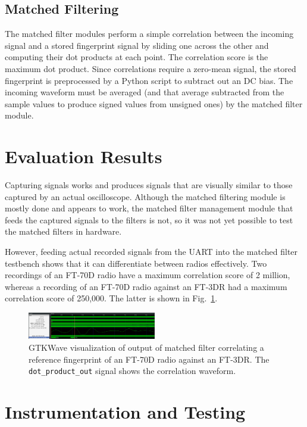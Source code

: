\documentclass[conference]{IEEEtran}
\begin{document}
\subsection{Matched Filtering}

The matched filter modules perform a simple correlation between the incoming signal and a stored fingerprint signal by sliding one across the other and computing their dot products at each point. The correlation score is the maximum dot product. Since correlations require a zero-mean signal, the stored fingerprint is preprocessed by a Python script to subtract out an DC bias. The incoming waveform must be averaged (and that average subtracted from the sample values to produce signed values from unsigned ones) by the matched filter module.

\section{Evaluation Results}

Capturing signals works and produces signals that are visually similar to those captured by an actual oscilloscope. Although the matched filtering module is mostly done and appears to work, the matched filter management module that feeds the captured signals to the filters is not, so it was not yet possible to test the matched filters in hardware.

However, feeding actual recorded signals from the UART into the matched filter testbench shows that it can differentiate between radios effectively. Two recordings of an FT-70D radio have a maximum correlation score of 2 million, whereas a recording of an FT-70D radio against an FT-3DR had a maximum correlation score of 250,000. The latter is shown in Fig.~\ref{correlation}.

\begin{figure}
    \centerline{\includegraphics[width=0.5\textwidth]{FT70D_vs_FT3DR.png}}
    \caption{GTKWave visualization of output of matched filter correlating a reference fingerprint of an FT-70D radio against an FT-3DR. The \lstinline{dot_product_out} signal shows the correlation waveform.}
    \label{correlation}
\end{figure}

\section{Instrumentation and Testing}
\end{document}
